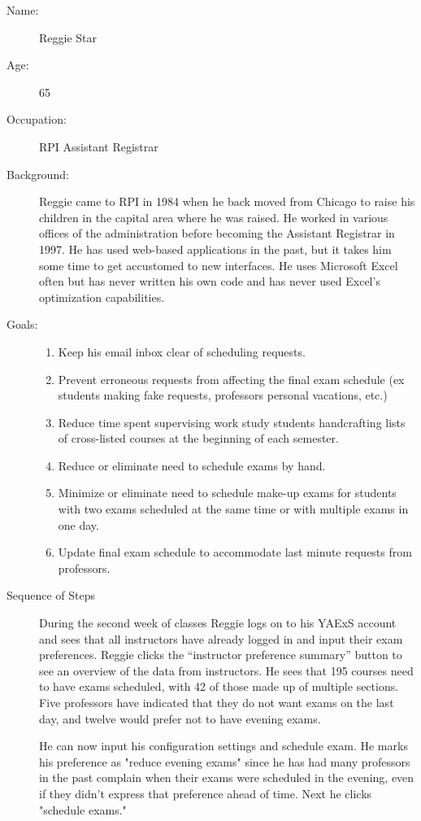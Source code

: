 \documentclass[11pt]{article}
\begin{document}
\begin{description}
\item[Name:] Reggie Star
\item[Age:]  65
\item[Occupation:] RPI Assistant Registrar
\item[Background:] Reggie came to RPI in 1984 when he  back moved from
 Chicago to raise his children in the capital area where he was raised. 
He worked in various offices of the administration before becoming
 the Assistant Registrar in 1997. 
He has used web-based applications in the past, but it takes him some 
time to get accustomed to new interfaces. 
He uses Microsoft Excel often but has never written his own code
 and has never used Excel’s optimization capabilities.

\item[Goals:]
\begin{enumerate}
\item Keep his email inbox clear of scheduling requests.
\item Prevent erroneous requests from affecting the final exam schedule
 (ex students making fake requests, professors personal vacations, etc.)
\item Reduce time spent supervising work study students handcrafting lists of
 cross-listed courses at the beginning of each semester.
\item Reduce or eliminate need to schedule exams by hand.
\item Minimize or eliminate need to schedule make-up exams for students with
 two exams scheduled at the same time or with multiple exams in one day.
\item Update final exam schedule to accommodate last minute requests 
from professors.
\end{enumerate}

\item[Sequence of Steps]
During the second week of classes Reggie logs on to his YAExS account and
 sees that all instructors have already logged in and input their exam preferences.  
Reggie clicks the “instructor preference summary” button to see an overview of
 the data from instructors. He sees that 195 courses need to have exams
 scheduled, with 42 of those made up of multiple sections. 
Five professors have indicated that they do not want exams on the last day, 
and twelve would prefer not to have evening exams.

He can now input his configuration settings and schedule exam.
He marks his preference as "reduce evening exams" since he has had many professors
in the past complain when their exams were scheduled in the evening, 
even if they didn't express that preference ahead of time. Next he clicks "schedule exams."


\end{description}
\end{document}
